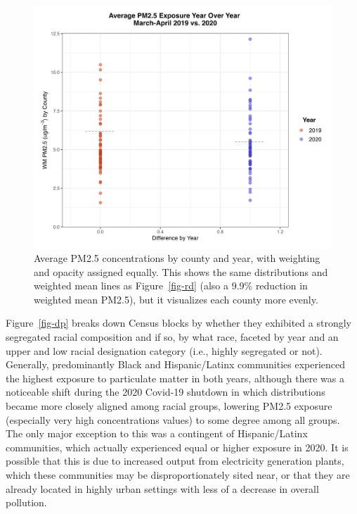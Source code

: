 \documentclass[12pt, ]{article}
\begin{document}
\begin{figure}[H]

{\centering \includegraphics{figures/County_Binary_Scatterplot_19v20.png}

}

\caption{\label{fig-bi}Average PM2.5 concentrations by county and year,
with weighting and opacity assigned equally. This shows the same
distributions and weighted mean lines as Figure~\ref{fig-rd} (also a
9.9\% reduction in weighted mean PM2.5), but it visualizes each county
more evenly.}

\end{figure}

Figure~\ref{fig-dp} breaks down Census blocks by whether they exhibited
a strongly segregated racial composition and if so, by what race,
faceted by year and an upper and low racial designation category (i.e.,
highly segregated or not). Generally, predominantly Black and
Hispanic/Latinx communities experienced the highest exposure to
particulate matter in both years, although there was a noticeable shift
during the 2020 Covid-19 shutdown in which distributions became more
closely aligned among racial groups, lowering PM2.5 exposure (especially
very high concentrations values) to some degree among all groups. The
only major exception to this was a contingent of Hispanic/Latinx
communities, which actually experienced equal or higher exposure in
2020. It is possible that this is due to increased output from
electricity generation plants, which these communities may be
disproportionately sited near, or that they are already located in
highly urban settings with less of a decrease in overall pollution.
\end{document}
